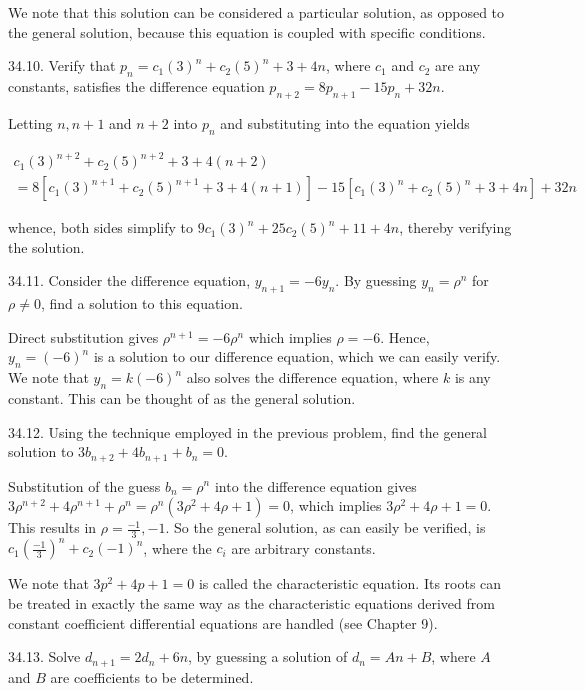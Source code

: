 \documentclass[10pt]{article}
\begin{document}
We note that this solution can be considered a particular solution, as opposed to the general solution, because this equation is coupled with specific conditions.

34.10. Verify that $p_{n}=c_{1}(3)^{n}+c_{2}(5)^{n}+3+4 n$, where $c_{1}$ and $c_{2}$ are any constants, satisfies the difference equation $p_{n+2}=8 p_{n+1}-15 p_{n}+32 n$.

Letting $n, n+1$ and $n+2$ into $p_{n}$ and substituting into the equation yields

$$
\begin{gathered}
c_{1}(3)^{n+2}+c_{2}(5)^{n+2}+3+4(n+2) \\
=8\left[c_{1}(3)^{n+1}+c_{2}(5)^{n+1}+3+4(n+1)\right]-15\left[c_{1}(3)^{n}+c_{2}(5)^{n}+3+4 n\right]+32 n
\end{gathered}
$$

whence, both sides simplify to $9 c_{1}(3)^{n}+25 c_{2}(5)^{n}+11+4 n$, thereby verifying the solution.

34.11. Consider the difference equation, $y_{n+1}=-6 y_{n}$. By guessing $y_{n}=\rho^{n}$ for $\rho \neq 0$, find a solution to this equation.

Direct substitution gives $\rho^{n+1}=-6 \rho^{n}$ which implies $\rho=-6$. Hence, $y_{n}=(-6)^{n}$ is a solution to our difference equation, which we can easily verify. We note that $y_{n}=k(-6)^{n}$ also solves the difference equation, where $k$ is any constant. This can be thought of as the general solution.

34.12. Using the technique employed in the previous problem, find the general solution to $3 b_{n+2}+4 b_{n+1}+b_{n}=0$.

Substitution of the guess $b_{n}=\rho^{n}$ into the difference equation gives $3 \rho^{n+2}+4 \rho^{n+1}+\rho^{n}=\rho^{n}\left(3 \rho^{2}+4 \rho+1\right)=0$, which implies $3 \rho^{2}+4 \rho+1=0$. This results in $\rho=\frac{-1}{3},-1$. So the general solution, as can easily be verified, is $c_{1}\left(\frac{-1}{3}\right)^{n}+c_{2}(-1)^{n}$, where the $c_{i}$ are arbitrary constants.

We note that $3 p^{2}+4 p+1=0$ is called the characteristic equation. Its roots can be treated in exactly the same way as the characteristic equations derived from constant coefficient differential equations are handled (see Chapter 9).

34.13. Solve $d_{n+1}=2 d_{n}+6 n$, by guessing a solution of $d_{n}=A n+B$, where $A$ and $B$ are coefficients to be determined.
\end{document}
